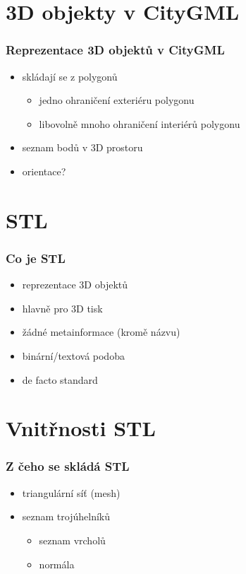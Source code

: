 \documentclass{beamer}
\begin{document}
\section{3D objekty v CityGML}

\begin{frame}
  \frametitle{Reprezentace 3D objektů v CityGML}
    \begin{itemize}[<+->]
      \item skládají se z polygonů
      \begin{itemize}[<+->]
        \item jedno ohraničení exteriéru polygonu
        \item libovolně mnoho ohraničení interiérů polygonu
      \end{itemize}
      \item seznam bodů v 3D prostoru
      \item orientace?
    \end{itemize}
\end{frame}

\section{STL}

\begin{frame}
  \frametitle{Co je STL}
    \begin{itemize}[<+->]
      \item reprezentace 3D objektů
      \item hlavně pro 3D tisk
      \item žádné metainformace (kromě názvu)
      \item binární/textová podoba
      \item de facto standard
    \end{itemize}
\end{frame}

\section{Vnitřnosti STL}

\begin{frame}
  \frametitle{Z čeho se skládá STL}
    \begin{itemize}[<+->]
      \item triangulární síť (mesh)
      \item seznam trojúhelníků
      \begin{itemize}[<+->]
        \item seznam vrcholů
        \item normála
      \end{itemize}
    \end{itemize}
\end{frame}
\end{document}
